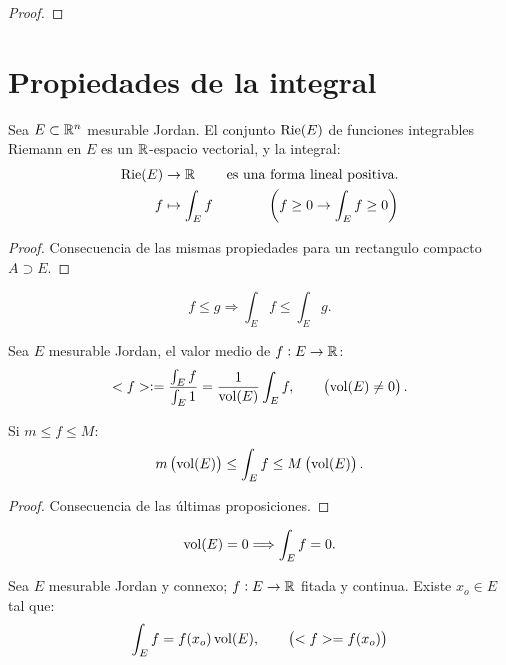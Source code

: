 \begin{proof}
    
\end{proof}

\section{Propiedades de la integral}

\begin{prop}
    Sea $E \subset \mathbb{R}^n$ mesurable Jordan. El conjunto $\operatorname{Rie}(E)$ de funciones integrables Riemann en $E$ es un $\mathbb{R}$-espacio vectorial, y la integral:
    \begin{align*}
        \operatorname{Rie}(E) &\to \mathbb{R} & \text{es una forma lineal positiva.} \\
        f &\mapsto \int_E f & \left( f \geq 0 \to \int_E f \geq 0 \right)
    \end{align*}
\end{prop}

\begin{proof}
    Consecuencia de las mismas propiedades para un rectangulo compacto $A \supset E$.
\end{proof}

\begin{col}[Monotonía]
    \[
    f \leq g \Longrightarrow \int_E f \leq \int_E g.
    \]
\end{col}

\begin{defi}
    Sea $E$ mesurable Jordan, el valor medio de $f : E \to \mathbb{R} $:
    \[
    <f> := \frac{\int_E f}{\int_E 1} = \frac{1}{\operatorname{vol}(E)} \int_E f, \qquad \left( \operatorname{vol}(E) \neq 0 \right).
    \]
\end{defi}

\begin{teo}
    Si $m \leq f \leq M$:
    \[
    m \left( \operatorname{vol}(E) \right) \leq \int_E f \leq M \left( \operatorname{vol}(E) \right).
    \]
\end{teo}

\begin{proof}
    Consecuencia de las últimas proposiciones.
\end{proof}

\begin{col}
    \[
    \operatorname{vol}(E) = 0 \Longrightarrow \int_E f = 0.
    \]
\end{col}

\begin{teo}
    Sea $E$ mesurable Jordan y connexo; $f : E \to \mathbb{R}$ fitada y continua. Existe $x_o \in E$ tal que:
    \[
    \int_E f = f(x_o) \operatorname{vol}(E), \qquad \left( <f> = f(x_o) \right)
    \]
\end{teo}

